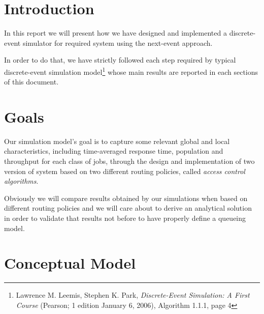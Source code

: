 \documentclass[10pt,a4paper]{article}
\begin{document}
\begin{frontespizio} 
\end{frontespizio} 

\tableofcontents


\newpage

\section{Introduction}

In this report we will present how we have designed and implemented a discrete-event simulator for required system using the next-event approach. 

In order to do that, we have strictly followed each step required by typical discrete-event simulation model\footnote{Lawrence M. Leemis, Stephen K. Park, \textit{Discrete-Event Simulation: A First Course} (Pearson; 1 edition January 6, 2006), Algorithm 1.1.1, page 4} whose main results are reported in each sections of this document.

\section{Goals}

Our simulation model's goal is to capture some relevant global and local characteristics, including time-averaged response time, population and throughput for each class of jobs, through the design and implementation of two version of system based on two different routing policies, called \textit{access control algorithms}.

Obviously we will compare results obtained by our simulations when based on different routing policies and we will care about to derive an analytical solution in order to validate that results not before to have properly define a queueing model.

\newpage
\section{Conceptual Model}
\end{document}
